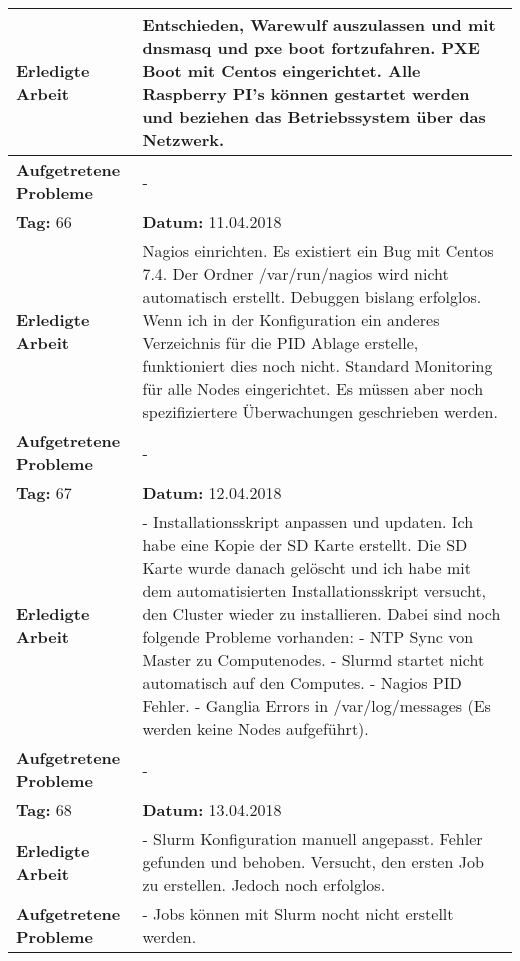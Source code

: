 \begin{longtable}{|p{5cm}|p{5cm}p{6cm}|}
\textbf{Erledigte Arbeit} & \multicolumn{2}{p{11cm}|}{Entschieden, Warewulf auszulassen und mit dnsmasq und pxe boot fortzufahren. PXE Boot mit Centos eingerichtet. Alle Raspberry PI's können gestartet werden und beziehen das Betriebssystem über das Netzwerk.} \\ \hline
\textbf{Aufgetretene Probleme} & \multicolumn{2}{p{11cm}|}{-} \\ \hline
\rowcolor{heading}\textbf{Tag:} 66 & \textbf{Datum:} 11.04.2018 & \\ \hline
\textbf{Erledigte Arbeit} & \multicolumn{2}{p{11cm}|}{Nagios einrichten. Es existiert ein Bug mit Centos 7.4. Der Ordner /var/run/nagios wird nicht automatisch erstellt. Debuggen bislang erfolglos. Wenn ich in der Konfiguration ein anderes Verzeichnis für die PID Ablage erstelle, funktioniert dies noch nicht. Standard Monitoring für alle Nodes eingerichtet. Es müssen aber noch spezifiziertere Überwachungen geschrieben werden.} \\ \hline
\textbf{Aufgetretene Probleme} & \multicolumn{2}{p{11cm}|}{-} \\ \hline
\rowcolor{heading}\textbf{Tag:} 67 & \textbf{Datum:} 12.04.2018 & \\ \hline
\textbf{Erledigte Arbeit} & \multicolumn{2}{p{11cm}|}{- Installationsskript anpassen und updaten. Ich habe eine Kopie der SD Karte erstellt. Die SD Karte wurde danach gelöscht und ich habe mit dem automatisierten Installationsskript versucht, den Cluster wieder zu installieren. Dabei sind noch folgende Probleme vorhanden: \newline - NTP Sync von Master zu Computenodes. \newline
- Slurmd startet nicht automatisch auf den Computes. \newline 
- Nagios PID Fehler. \newline 
- Ganglia Errors in /var/log/messages (Es werden keine Nodes aufgeführt).} \\ \hline
\textbf{Aufgetretene Probleme} & \multicolumn{2}{p{11cm}|}{-} \\ \hline
\rowcolor{heading}\textbf{Tag:} 68 & \textbf{Datum:} 13.04.2018 & \\ \hline
\textbf{Erledigte Arbeit} & \multicolumn{2}{p{11cm}|}{- Slurm Konfiguration manuell angepasst. Fehler gefunden und behoben. Versucht, den ersten Job zu erstellen. Jedoch noch erfolglos.} \\ \hline
\textbf{Aufgetretene Probleme} & \multicolumn{2}{p{11cm}|}{- Jobs können mit Slurm nocht nicht erstellt werden.} \\ \hline

\end{longtable}
